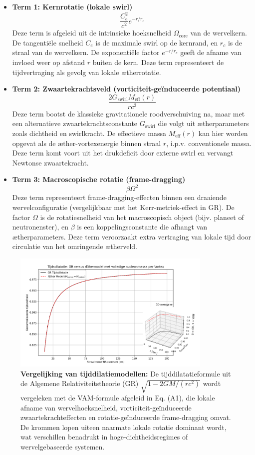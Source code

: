 \begin{itemize}
  \item \textbf{Term 1: Kernrotatie (lokale swirl)}
  \[
  \frac{C_e^2}{c^2} e^{-r/r_c}
  \]
  Deze term is afgeleid uit de intrinsieke hoeksnelheid $\Omega_\text{core}$ van de wervelkern. De tangentiële snelheid $C_e$ is de maximale swirl op de kernrand, en $r_c$ is de straal van de wervelkern. De exponentiële factor $e^{-r/r_c}$ geeft de afname van invloed weer op afstand $r$ buiten de kern. Deze term representeert de tijdvertraging als gevolg van lokale ætherrotatie.

  \item \textbf{Term 2: Zwaartekrachtsveld (vorticiteit-geïnduceerde potentiaal)}
  \[
  \frac{2 G_\text{swirl} M_\text{eff}(r)}{r c^2}
  \]
  Deze term bootst de klassieke gravitationele roodverschuiving na, maar met een alternatieve zwaartekrachtsconstante $G_\text{swirl}$ die volgt uit ætherparameters zoals dichtheid en swirlkracht. De effectieve massa $M_\text{eff}(r)$ kan hier worden opgevat als de æther-vortexenergie binnen straal $r$, i.p.v. conventionele massa. Deze term komt voort uit het drukdeficit door externe swirl en vervangt Newtonse zwaartekracht.

  \item \textbf{Term 3: Macroscopische rotatie (frame-dragging)}
  \[
  \beta \Omega^2
  \]
  Deze term representeert frame-dragging-effecten binnen een draaiende wervelconfiguratie (vergelijkbaar met het Kerr-metriek-effect in GR). De factor $\Omega$ is de rotatiesnelheid van het macroscopisch object (bijv. planeet of neutronenster), en $\beta$ is een koppelingsconstante die afhangt van ætherparameters. Deze term veroorzaakt extra vertraging van lokale tijd door circulatie van het omringende ætherveld.

\end{itemize}

\begin{figure}[H]
  \centering
  \includegraphics[width=0.85\textwidth]{images/07-TimeDilationGRVsVAM_nl}
  \caption{
  \textbf{Vergelijking van tijddilatiemodellen:} De tijddilatatieformule uit de Algemene Relativiteitstheorie (GR) \(\sqrt{1 - 2GM/(rc^2)}\) wordt vergeleken met de VAM-formule afgeleid in Eq. (A1), die lokale afname van wervelhoeksnelheid, vorticiteit-geïnduceerde zwaartekrachteffecten en rotatie-geïnduceerde frame-dragging omvat. De krommen lopen uiteen naarmate lokale rotatie dominant wordt, wat verschillen benadrukt in hoge-dichtheidsregimes of wervelgebaseerde systemen.
  }
  \label{fig:GRvsVAMTimeDilation}
\end{figure}

